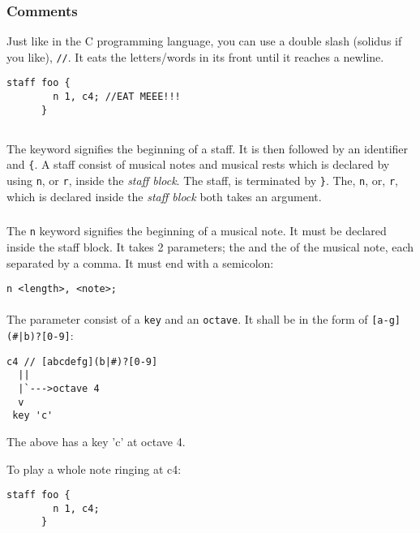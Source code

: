 \subsubsection{Comments}
\np Just like in the C programming language, you can use a double slash (solidus if you like), \verb+//+.
It eats the letters/words in its front until it reaches a newline.
\begin{Verbatim}[frame=single]
      staff foo {
        n 1, c4; //EAT MEEE!!!
      }
\end{Verbatim}

\subsection{}
\np The  keyword signifies the beginning of a staff. It is then followed by an identifier and \verb+{+. A staff consist of
musical notes and musical rests which is declared by using \verb+n+, or \verb+r+, inside the \textit{staff block}.
The staff, is terminated by \verb+}+. The, \verb+n+, or, \verb+r+, which is declared inside the \textit{staff block} both takes an argument.

\subsubsection{}

\np The \verb+n+ keyword signifies the beginning of a musical note. It must be declared
inside the staff block.
It takes 2 parameters; the  and the  of the
musical note, each separated by a comma. It must end with a semicolon: 

\begin{Verbatim}[frame=single]
      n <length>, <note>;
\end{Verbatim}

\paragraph{} The parameter  consist of a \verb+key+ and an \verb+octave+. It shall be in the form of \verb+[a-g](#|b)?[0-9]+:

\begin{Verbatim}[frame=single]
  c4 // [abcdefg](b|#)?[0-9]
  ||
  |`--->octave 4
  v
 key 'c'
\end{Verbatim}
The above has a key 'c' at octave 4.

\np To play a whole note ringing at c4:
\begin{Verbatim}[frame=single]
      staff foo {
        n 1, c4;
      }
\end{Verbatim}

